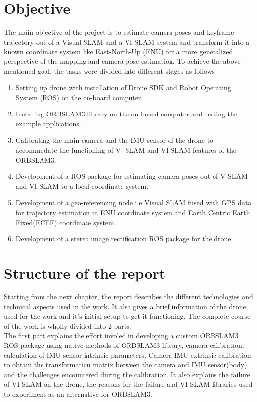 \section{Objective}
\label{sec:intro:objective}
The main objective of the project is to estimate camera poses and keyframe trajectory out of a Visual SLAM and a VI-SLAM system and transform it into a known coordinate system like East-North-Up (ENU) for a more generalized perspective of the mapping and camera pose estimation. To achieve the above mentioned goal, the tasks were divided into different stages as follows-
\begin{enumerate}
    \item Setting up drone with installation of Drone SDK and Robot Operating System (ROS) \cite{quigley2009ros} on the on-board computer.
    \item Installing ORBSLAM3\cite{ORBSLAM3_2020} library on the on-board computer and testing the example applications.
    \item Calibrating the main camera and the IMU sensor of the drone to accommodate the functioning of V- SLAM and VI-SLAM features of the ORBSLAM3\cite{ORBSLAM3_2020}.
    \item Development of a ROS package for estimating camera poses out of V-SLAM and VI-SLAM to a local coordinate system.
    \item Development of a geo-referencing node i.e  Visual SLAM fused with GPS data for trajectory estimation in ENU coordinate system and Earth Centric Earth Fixed(ECEF) coordinate system.
    \item Development of a stereo image rectification ROS package for the drone. 
\end{enumerate}

\section{Structure of the report}
\label{sec:intro:structureofthereport}
Starting from the next chapter, the report describes the different technologies and technical aspects used in the work. It also gives a brief information of the drone used for the work and it's initial setup to get it functioning. The complete course of the work is wholly divided into 2 parts.\\

The first part explains the effort involed in developing a custom ORBSLAM3 ROS package using native methods of ORBSLAM3 library, camera calibration, calculation of IMU sensor intrinsic parameters, Camera-IMU extrinsic calibration to obtain the transformation matrix between the camera and IMU sensor(body) and the challenges encountered during the calibration. It also explains the failure of VI-SLAM on the drone, the reasons for the failure and VI-SLAM libraries used to experiment as an alternative for ORBSLAM3.\\

